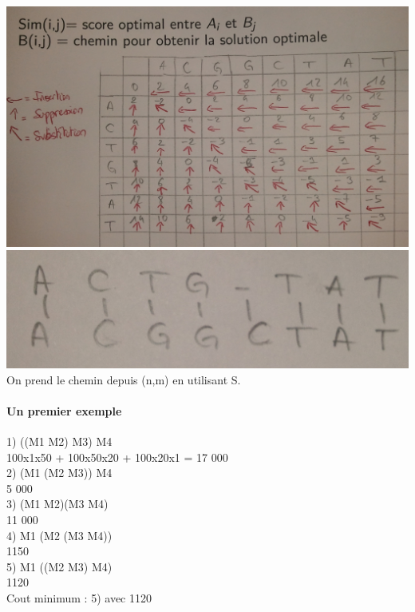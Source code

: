 \includegraphics[width=15cm]{Photo0089}\\

\includegraphics[width=15cm]{Photo0091}\\

On prend le chemin depuis (n,m) en utilisant S.

\paragraph{Un premier exemple}

1) ((M1 M2) M3) M4\\
   100x1x50 + 100x50x20 + 100x20x1 = 17 000\\
   
2) (M1 (M2 M3)) M4\\
   5 000\\
   
3) (M1 M2)(M3 M4)\\
   11 000\\

4) M1 (M2 (M3 M4))\\
   1150\\

5) M1 ((M2 M3) M4)\\
   1120\\
   
Cout minimum : 5) avec 1120
 
